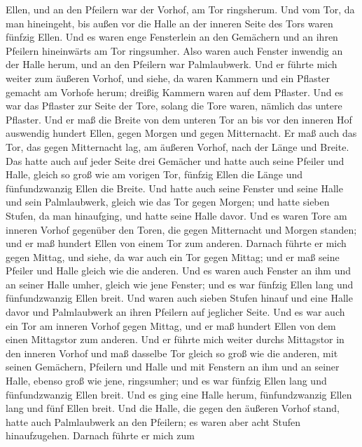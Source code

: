 Ellen, und an den Pfeilern war der Vorhof, am Tor ringsherum.
 Und vom Tor, da man hineingeht, bis außen vor die Halle an
der inneren Seite des Tors waren fünfzig Ellen.  Und es
waren enge Fensterlein an den Gemächern und an ihren Pfeilern
hineinwärts am Tor ringsumher. Also waren auch Fenster inwendig an der
Halle herum, und an den Pfeilern war Palmlaubwerk.  Und er
führte mich weiter zum äußeren Vorhof, und siehe, da waren Kammern und
ein Pflaster gemacht am Vorhofe herum; dreißig Kammern waren auf dem
Pflaster.  Und es war das Pflaster zur Seite der Tore,
solang die Tore waren, nämlich das untere Pflaster.  Und er
maß die Breite von dem unteren Tor an bis vor den inneren Hof auswendig
hundert Ellen, gegen Morgen und gegen Mitternacht.  Er maß
auch das Tor, das gegen Mitternacht lag, am äußeren Vorhof, nach der
Länge und Breite.  Das hatte auch auf jeder Seite drei
Gemächer und hatte auch seine Pfeiler und Halle, gleich so groß wie am
vorigen Tor, fünfzig Ellen die Länge und fünfundzwanzig Ellen die
Breite.  Und hatte auch seine Fenster und seine Halle und
sein Palmlaubwerk, gleich wie das Tor gegen Morgen; und hatte sieben
Stufen, da man hinaufging, und hatte seine Halle davor. 
Und es waren Tore am inneren Vorhof gegenüber den Toren, die gegen
Mitternacht und Morgen standen; und er maß hundert Ellen von einem Tor
zum anderen.  Darnach führte er mich gegen Mittag, und
siehe, da war auch ein Tor gegen Mittag; und er maß seine Pfeiler und
Halle gleich wie die anderen.  Und es waren auch Fenster an
ihm und an seiner Halle umher, gleich wie jene Fenster; und es war
fünfzig Ellen lang und fünfundzwanzig Ellen breit.  Und
waren auch sieben Stufen hinauf und eine Halle davor und Palmlaubwerk an
ihren Pfeilern auf jeglicher Seite.  Und es war auch ein
Tor am inneren Vorhof gegen Mittag, und er maß hundert Ellen von dem
einen Mittagstor zum anderen.  Und er führte mich weiter
durchs Mittagstor in den inneren Vorhof und maß dasselbe Tor gleich so
groß wie die anderen,  mit seinen Gemächern, Pfeilern und
Halle und mit Fenstern an ihm und an seiner Halle, ebenso groß wie jene,
ringsumher; und es war fünfzig Ellen lang und fünfundzwanzig Ellen
breit.  Und es ging eine Halle herum, fünfundzwanzig Ellen
lang und fünf Ellen breit.  Und die Halle, die gegen den
äußeren Vorhof stand, hatte auch Palmlaubwerk an den Pfeilern; es waren
aber acht Stufen hinaufzugehen.  Darnach führte er mich zum
